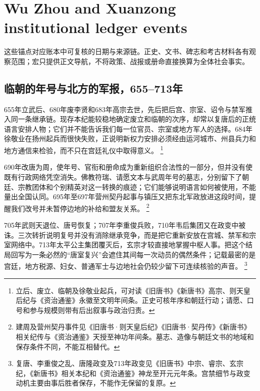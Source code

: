 \section{Wu Zhou and Xuanzong institutional ledger events}
\label{sec:wu-zhou-event-anchors-batch-two}
这些锚点对应账本中可复核的日期与来源链。正史、文书、碑志和考古材料各有观察范围；宏只提供正文导航，不将政策、战报或册命直接换算为全体社会事实。

\subsection{临朝的年号与北方的军报，655--713年}

655年立武后、680年废李贤和683年高宗去世，先后把后宫、宗室、诏令与禁军推入同一条继承链。现存本纪能较稳地确定废立和临朝的次序，却常以复唐后的正统语言安排人物；它们并不能告诉我们每一位官员、宗室或地方军人的选择。684年徐敬业在扬州起兵而很快失败，正说明新权力安排必须经由运河城市、州县兵力和地方通信来检验，而不只在宫廷礼仪中取得意义。%
\footnote{立后、废立、临朝及徐敬业起兵，可对读《旧唐书》《新唐书》高宗、则天皇后纪与《资治通鉴》永徽至文明年间条。正史可核年序和朝廷行动；请愿、口号和参与规模则带有后出叙事与政治归责。}

690年改唐为周，使年号、官衔和册命成为重新组织合法性的一部分，但并没有使既有行政网络凭空消失。佛教符瑞、请愿文本与武周年号的墓志，分别留下了朝廷、宗教团体和个别精英对这一转换的痕迹；它们能够说明语言如何被使用，不能量出全国认同。695年至697年营州契丹起事与镇压又把东北军政放进这段时间，提醒我们改号并未暂停边地的补给和盟友关系。%
\footnote{建周及营州契丹事件见《旧唐书·则天皇后纪》《旧唐书·契丹传》《新唐书》相关纪传与《资治通鉴》天授至神功年间条。墓志、造像与朝廷文书的地域和保存条件不同，不能互相替代。}

705年武则天退位、唐号恢复；707年李重俊兵败，710年韦后集团又在政变中被诛。三次转折说明复号并没有消除继承竞争，而是把它重新安放在宫城、禁军和宗室网络中。713年太平公主集团覆灭后，玄宗才较直接地掌握中枢人事。把这个结局回写为一条必然的“唐室复兴”会遮住其间每一次动员的偶然条件；记载最密的是宫廷，地方税源、妇女、普通军士与边地社会仍较少留下可连续核验的声音。%
\footnote{复唐、李重俊之乱、唐隆政变及713年政变见《旧唐书》中宗、睿宗、玄宗纪，《新唐书》相关本纪和《资治通鉴》神龙至开元元年条。宫禁细节与政变动机主要由事后胜者保存，不能作无保留的复原。}


